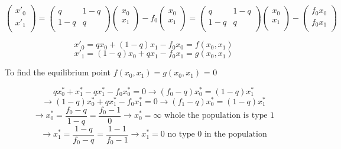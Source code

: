 \[ \begin{pmatrix}
         x'_0\\
         x'_1\\
       \end{pmatrix}  = 
       \begin{pmatrix}
                q & 1-q\\
                1-q & q\\
              \end{pmatrix}
              \begin{pmatrix}
                             x_0\\
                              x_1\\
                            \end{pmatrix} - f_0 \begin{pmatrix}
                                            x_0\\
                                            x_1\\
                                          \end{pmatrix} =        \begin{pmatrix}
                                                          q & 1-q\\
                                                          1-q & q\\
                                                        \end{pmatrix}
                                                        \begin{pmatrix}
                                                                       x_0\\
                                                                        x_1\\
                                                                      \end{pmatrix} - \begin{pmatrix}
                                                                                                   f_0x_0\\
                                                                                                   f_0x_1\\
                                                                                                 \end{pmatrix}\] 

\[  x'_0 = qx_0 + (1-q)x_1 -f_0x_0 = f(x_{0}, x_1)\]
\[  x'_1 = (1-q)x_0+qx_1-f_0x_1 = g(x_0,x_1)\]

To find the equilibrium point $f(x_0, x_1) = g(x_0, x_1)$ = 0

\[ qx^*_0 + x^*_1 -qx^*_1 - f_0x^*_0 = 0 \rightarrow (f_0-q)x^*_0 = (1-q)x^*_1\]
\[ \rightarrow (1-q)x^*_0+qx^*_1-f_0x^*_1 = 0 \rightarrow (f_1-q)x^*_0 = (1-q)x^*_1\]
\[ \rightarrow x^*_0 = \frac{f_0-q}{1-q}= \frac{f_0-1}{0} \rightarrow x^*_0 = \infty \text{ whole the population is type 1}\]
\[ \rightarrow x^*_1 = \frac{1-q}{f_0-q}= \frac{1-1}{f_0-1} \rightarrow x^*_1 = 0 \text{ no type 0 in the population}\]